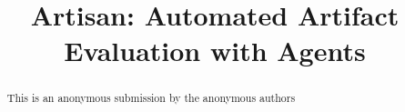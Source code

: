 \documentclass[acmsmall,screen,review,anonymous]{acmart}
\begin{document}
\title{Artisan: Automated Artifact Evaluation with Agents}
\begin{abstract}
    This is an anonymous submission by the anonymous authors
\end{abstract}
\maketitle









\end{document}
